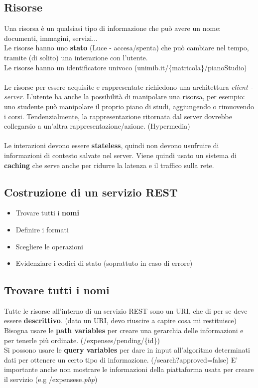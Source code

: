 \documentclass[12pt, a4paper]{article}
\begin{document}
    \subsection*{Risorse}
    Una risorsa è un qualsiasi tipo di informazione che può avere un nome: documenti, immagini,
    servizi...\\
    Le risorse hanno uno \textbf{stato} (Luce - accesa/spenta) che può cambiare nel tempo, tramite (di solito)
    una interazione con l'utente.
    \\Le risorse hanno un identificatore univoco (unimib.it/\{matricola\}/pianoStudio)
    \\\\
    Le risorse per essere acquisite e rappresentate richiedono una architettura \textit{client - server}.
    L'utente ha anche la possibilità di manipolare una risorsa, per esempio: uno studente può manipolare
    il proprio piano di studi, aggiungendo o rimuovendo i corsi.
    Tendenzialmente, la rappresentazione ritornata dal server dovrebbe collegarsio a un'altra
    rappresentazione/azione. (Hypermedia)
    \\\\
    Le interazioni devono essere \textbf{stateless}, quindi non devono usufruire di informazioni di contesto salvate nel server.
    Viene quindi usato un sistema di \textbf{caching} che serve anche per ridurre la latenza e il traffico sulla rete.
    \newpage
    \subsection{Costruzione di un servizio REST}
    \begin{itemize}
        \item Trovare tutti i \textbf{nomi}
        \item Definire i formati
        \item Scegliere le operazioni
        \item Evidenziare i codici di stato (soprattuto in caso di errore)
    \end{itemize}
    \subsection*{Trovare tutti i nomi}
    Tutte le risorse all'interno di un servizio REST sono un URI, che di per se deve
    essere \textbf{descrittivo}. (dato un URI, devo riuscire a capire cosa mi restituisce)
    \\Bisogna usare le \textbf{path variables} per creare una gerarchia delle informazioni
    e per tenerle più ordinate. (/expenses/pending/\{id\})
    \\Si possono usare le \textbf{query variables} per dare in input all'algoritmo determinati dati
    per ottenere un certo tipo di informazione. (/search?approved=false)
    E' importante anche non mostrare le informazioni della piattaforma usata per creare il servizio (e.g /expensese\textit{.php})
\end{document}
